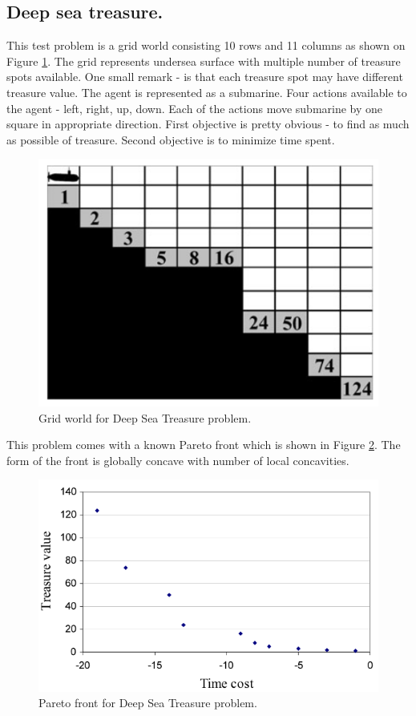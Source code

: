 {{\subsection{Deep sea treasure.}
This test problem is a grid world consisting 10 rows and 11 columns as shown on Figure \ref{fig:DSTOverview}. The grid represents undersea surface with multiple number of treasure spots available. One small remark - is that each treasure spot may have different treasure value. The agent is represented as a submarine. Four actions available to the agent - left, right, up, down. Each of the actions move submarine by one square in appropriate direction. First objective is pretty obvious - to find as much as possible of treasure. Second objective is to minimize time spent. \\
\begin{figure}[ht]
\vskip 0.2in
\centering
\includegraphics[scale=0.9]{dst.png}
\caption{Grid world for Deep Sea Treasure problem.}
\label{fig:DSTOverview}
\end{figure}

This problem comes with a known Pareto front which is shown in Figure \ref{fig:DSTFront}. The form of the front is globally concave with number of local concavities.
\begin{figure}[ht]
\vskip 0.2in
\centering
\includegraphics[scale=0.9]{dstPareto.png}
\caption{Pareto front for Deep Sea Treasure problem.}
\label{fig:DSTFront}
\end{figure}

}}
